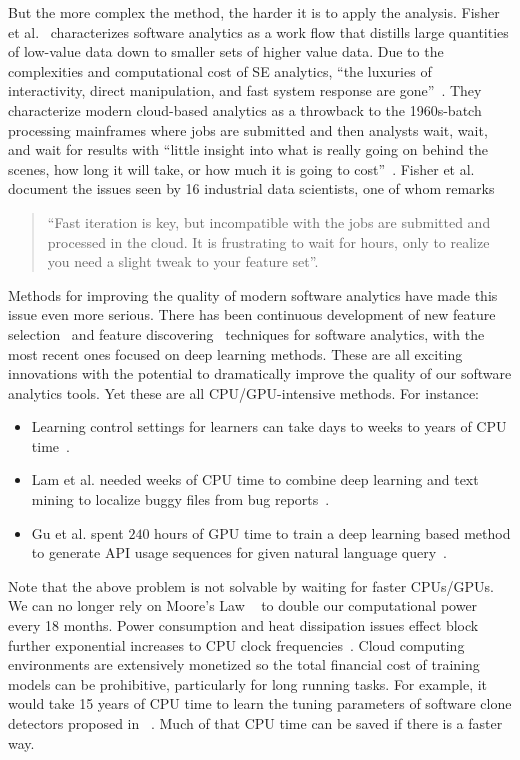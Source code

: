 \documentclass[sigconf]{acmart}
\theoremstyle{break}
\newcommand{\bi}{\begin{itemize}[leftmargin=0.4cm]}
\newcommand{\ei}{\end{itemize}}
\begin{document}
But the more complex the  method,
the harder it is to apply the analysis.
Fisher et al.~\cite{fisher2012interactions} characterizes software analytics as a work flow that distills large quantities of low-value data down to smaller sets of higher value data. Due to the complexities and computational cost of SE analytics, ``the luxuries of interactivity, direct manipulation, and fast system response are gone''~\cite{fisher2012interactions}. They characterize modern cloud-based analytics as a throwback to the 1960s-batch processing mainframes where jobs are submitted and then analysts wait, wait, and wait for results with ``little insight into what is really going on behind the scenes, how long it will take, or how much it is going to cost''~\cite{fisher2012interactions}. Fisher et al. ~\cite{fisher2012interactions} document the issues seen by 16 industrial data scientists, one of whom remarks \begin{quote}
``Fast iteration is key, but incompatible with the jobs are submitted and processed in the cloud. It is frustrating to wait for hours, only to realize you need a slight tweak to your feature set''.
\end{quote}

Methods for improving the quality of modern software analytics have made this issue even more serious. There has been continuous development of new feature selection~\cite{hall2003benchmarking} and feature discovering~\cite{jiang2013personalized} techniques for software analytics, with the most recent ones focused on deep learning methods. These are all exciting innovations with the potential to dramatically improve the quality of our software analytics tools. Yet these are all CPU/GPU-intensive methods. For instance:
\bi
\item Learning control settings for learners can take days to weeks to years of CPU time~\cite{fu2016differential,tantithamthavorn2016automated,wang2013searching}.
\item Lam et al. needed weeks of CPU time to combine deep learning and text mining to localize buggy
files from bug reports~\cite{lam2015combining}.
\item Gu et al. spent $240$ hours of GPU time  to train a deep learning based method to generate API usage sequences for given natural language query~\cite{gu2016deep}. 
\ei 
Note that the above problem is not solvable by waiting for faster CPUs/GPUs. We 
can no longer rely on Moore's Law ~\cite{moore1998cramming} to double our computational power every 18 months. Power consumption and heat dissipation issues effect block further exponential increases to CPU clock frequencies~\cite{kumar2003single}. Cloud computing environments are extensively monetized so the total financial cost of training models can be prohibitive, particularly for long running tasks. For example, it would take 15 years of CPU time to learn the tuning parameters of software clone detectors proposed in ~\cite{wang2013searching}. Much of that CPU time can be saved if there is a faster  way.
\end{document}
